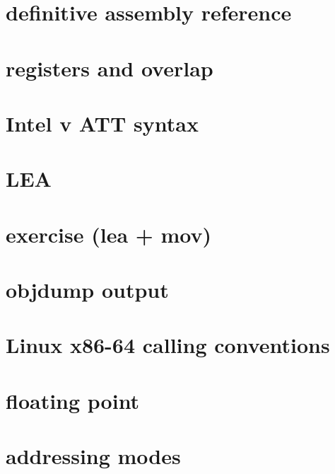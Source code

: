\section{definitive assembly reference}



\section{registers and overlap}



\section{Intel v ATT syntax}



\section{LEA}


\section{exercise (lea + mov)}



\section{objdump output}


\section{Linux x86-64 calling conventions}



\section{floating point}




\section{addressing modes} %

